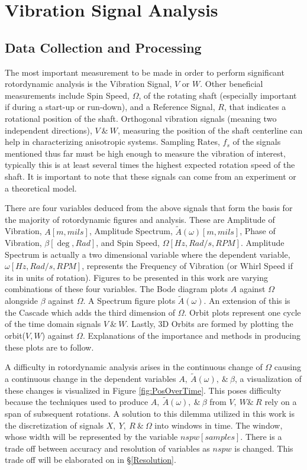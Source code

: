 \chapter{Vibration Signal Analysis}\label{VibrationSignalAnalysis}
\section{Data Collection and Processing}
The most important measurement to be made in order to perform significant rotordynamic analysis is the Vibration Signal, $ V $ or $ W $. Other beneficial measurements include Spin Speed, $ \Omega $, of the rotating shaft (especially important if during a start-up or run-down), and a Reference Signal, $ R $, that indicates a rotational position of the shaft. Orthogonal vibration signals (meaning two independent directions), $ V\ \&\ W $, measuring the position of the shaft centerline can help in characterizing anisotropic systems. Sampling Rates, $ f_s $ of the signals mentioned thus far must be high enough to measure the vibration of interest, typically this is at least several times the highest expected rotation speed of the shaft. It is important to note that these signals can come from an experiment or a theoretical model.\par
There are four variables deduced from the above signals that form the basis for the majority of rotordynamic figures and analysis. These are Amplitude of Vibration, $ A[m,mils] $, Amplitude Spectrum, $ \tilde{A}(\omega)[m,mils] $, Phase of Vibration, $ \beta[\deg,Rad] $, and Spin Speed, $ \Omega[Hz,Rad/s,RPM] $. Amplitude Spectrum is actually a two dimensional variable where the dependent variable, $ \omega[Hz,Rad/s,RPM] $, represents the Frequency of Vibration (or Whirl Speed if its in units of rotation). Figures to be presented in this work are varying combinations of these four variables. The Bode diagram plots $ A $ against $ \Omega $ alongside $ \beta $  against $ \Omega $. A Spectrum figure plots $ \tilde{A}(\omega) $. An extension of this is the Cascade which adds the third dimension of $ \Omega $. Orbit plots represent one cycle of the time domain signals $ V\ \&\ W $. Lastly, 3D Orbits are formed by plotting the orbit($ V,W $) against $ \Omega $. Explanations of the importance and methods in producing these plots are to follow. \par
A difficulty in rotordynamic analysis arises in the continuous change of $ \Omega $ causing a continuous change in the dependent variables $ A,\ \tilde{A}(\omega),\ \&\ \beta $, a visualization of these changes is visualized in Figure \ref{fig:PosOverTime}. This poses difficulty because the techniques used to produce $ A,\ \tilde{A}(\omega),\ \&\ \beta $ from $ V,\ W\&\ R $ rely on a span of subsequent rotations. A solution to this dilemma utilized in this work is the discretization of signals $ X,\ Y,\ R\ \&\ \Omega $ into windows in time. The window, whose width will be represented by the variable $ nspw[samples] $. There is a trade off between accuracy and resolution of variables as $ nspw $ is changed. This trade off will be elaborated on in \S\ref{Resolution}.\par 
